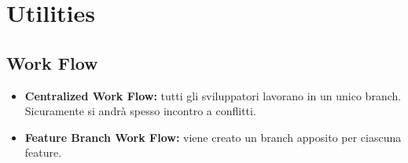 \documentclass[12pt, a4paper]{article}
\begin{document}
\clearpage

\appendix

\section{Utilities}
\subsection{Work Flow}
\begin{itemize}
    \item[] \textbf{Centralized Work Flow:} tutti gli sviluppatori lavorano in un unico branch. Sicuramente si andrà spesso incontro a conflitti.
    \item[] \textbf{Feature Branch Work Flow:} viene creato un branch apposito per ciascuna feature.
\end{itemize}
\end{document}
